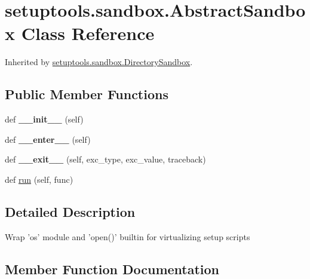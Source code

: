 \hypertarget{classsetuptools_1_1sandbox_1_1_abstract_sandbox}{}\section{setuptools.\+sandbox.\+Abstract\+Sandbox Class Reference}
\label{classsetuptools_1_1sandbox_1_1_abstract_sandbox}


Inherited by \hyperlink{classsetuptools_1_1sandbox_1_1_directory_sandbox}{setuptools.\+sandbox.\+Directory\+Sandbox}.

\subsection*{Public Member Functions}
\begin{DoxyCompactItemize}
\item 
\mbox{\label{classsetuptools_1_1sandbox_1_1_abstract_sandbox_a283fc5635c6a4b806b444d36deb92c9b}} 
def {\bfseries \+\_\+\+\_\+init\+\_\+\+\_\+} (self)
\item 
\mbox{\label{classsetuptools_1_1sandbox_1_1_abstract_sandbox_a6fd06ba03e09745ee61151b4078c4dae}} 
def {\bfseries \+\_\+\+\_\+enter\+\_\+\+\_\+} (self)
\item 
\mbox{\label{classsetuptools_1_1sandbox_1_1_abstract_sandbox_adbfcba2aa94e7498b701864192f0576b}} 
def {\bfseries \+\_\+\+\_\+exit\+\_\+\+\_\+} (self, exc\+\_\+type, exc\+\_\+value, traceback)
\item 
def \hyperlink{classsetuptools_1_1sandbox_1_1_abstract_sandbox_a1a04bbba7a8e1a1afe0446d5b70c0dca}{run} (self, func)
\end{DoxyCompactItemize}


\subsection{Detailed Description}
\begin{DoxyVerb}Wrap 'os' module and 'open()' builtin for virtualizing setup scripts\end{DoxyVerb}
 

\subsection{Member Function Documentation}
\mbox{\label{classsetuptools_1_1sandbox_1_1_abstract_sandbox_a1a04bbba7a8e1a1afe0446d5b70c0dca}} 
